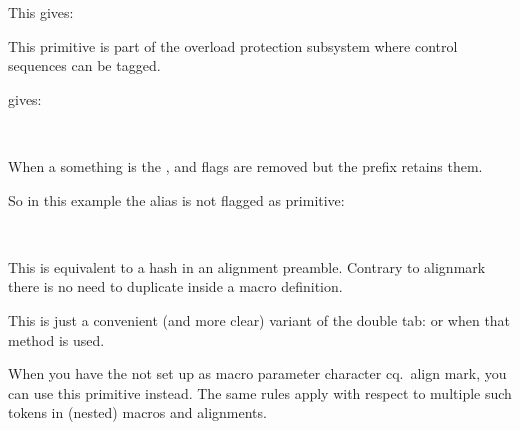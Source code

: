 \typebuffer

This gives:

\startpacked\getbuffer\stoppacked

\stopnewprimitive

\startnewprimitive[title={\prm {aliased}}]

This primitive is part of the overload protection subsystem where control sequences
can be tagged.

\startbuffer
\permanent{}
          \let\ofo\foo
\aliased  \let\oof\foo

\meaningasis\foo
\meaningasis\ofo
\meaningasis\oof
\stopbuffer

\typebuffer

gives:

\startlines \tt
\getbuffer
\stoplines

When a something is  the ,  and
 flags are removed but the  prefix retains
them.

\startbuffer
\let\relaxed\relax

\meaningasis\relax
\meaningasis\relaxed
\stopbuffer

\typebuffer

So in this example the \type {\relaxed} alias is not flagged as primitive:

\startlines \tt
\getbuffer
\stoplines

\stopnewprimitive

\startnewprimitive[title={\prm {aligncontent}}]

This is equivalent to a hash in an alignment preamble. Contrary to \prm
{alignmark} there is no need to duplicate inside a macro definition.

\stopnewprimitive

\startnewprimitive[title={\prm {alignloop}}]

This is just a convenient (and more clear) variant of the double tab: \typ
{\aligntab \aligntab} or \type {&&} when that method is used.

\stopnewprimitive

\startnewprimitive[title={\prm {alignmark}}]

When you have the \type {#} not set up as macro parameter character cq.\ align
mark, you can use this primitive instead. The same rules apply with respect to
multiple such tokens in (nested) macros and alignments.

\stopnewprimitive

\startnewprimitive[title={\prm {alignmentcellsource}}]

